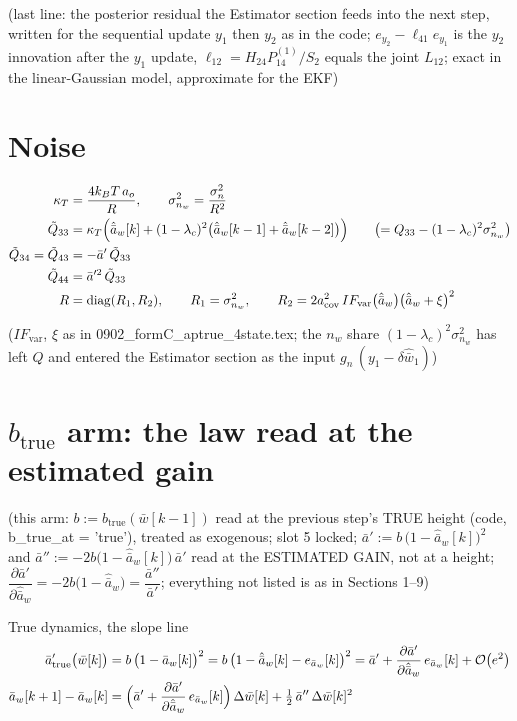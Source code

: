 \documentclass[11pt,a4paper,fontset=none]{ctexart}
\newcommand{\ba}{\bar{a}}
\newcommand{\bw}{\bar{w}}
\newcommand{\dW}{\Delta\bw}
\newcommand{\ap}{\ba'}
\newcommand{\app}{\ba''}
\begin{document}
(last line: the posterior residual the Estimator section feeds into the next step, written for the sequential update
$y_1$ then $y_2$ as in the code; $e_{y_2} - \ell_{41}e_{y_1}$ is the $y_2$ innovation after the $y_1$ update,
$\ell_{12} = H_{24}P^{(1)}_{14}/S_2$ equals the joint $L_{12}$; exact in the linear-Gaussian model, approximate for the EKF)

\section{Noise}

\begin{align*}
\kappa_T &= \frac{4k_BT\,a_o}{R}, \qquad \sigma^{2}_{n_w} = \frac{\sigma^{2}_{n}}{R^{2}} \\
\tilde{Q}_{33} &= \kappa_T\Bigl(\hat{\ba}_w[k] + (1-\lambda_c)^{2}\bigl(\hat{\ba}_w[k-1] + \hat{\ba}_w[k-2]\bigr)\Bigr)
   \qquad \bigl(= Q_{33} - (1-\lambda_c)^{2}\sigma^{2}_{n_w}\bigr) \\
\tilde{Q}_{34} = \tilde{Q}_{43} &= -\ap\,\tilde{Q}_{33} \\
\tilde{Q}_{44}   &= \ap^{2}\,\tilde{Q}_{33} \\
R        &= \mathrm{diag}(R_1, R_2), \qquad R_1 = \sigma^{2}_{n_w}, \qquad
R_2 = 2a_{\mathrm{cov}}^{2}\,IF_{\mathrm{var}}\bigl(\hat{\ba}_w\bigr)\bigl(\hat{\ba}_w + \xi\bigr)^{2}
\end{align*}

($IF_{\mathrm{var}}$, $\xi$ as in 0902\_formC\_aptrue\_4state.tex; the $n_w$ share $(1-\lambda_c)^{2}\sigma^{2}_{n_w}$ has left $Q$ and entered the Estimator section as the input $g_n\,(y_1 - \delta\hat{\bw}_1)$)

\clearpage
\section{$b_{\mathrm{true}}$ arm: the law read at the estimated gain}

(this arm: $b := b_{\mathrm{true}}(\bw[k-1])$ read at the previous step's TRUE height (code, b\_true\_at = 'true'), treated as exogenous; slot 5 locked;
$\ap := b\,\bigl(1 - \hat{\ba}_w[k]\bigr)^{2}$ and $\app := -2b\bigl(1 - \hat{\ba}_w[k]\bigr)\,\ap$ read at the ESTIMATED GAIN, not at a height;
$\dfrac{\partial\ap}{\partial\hat{\ba}_w} = -2b\bigl(1 - \hat{\ba}_w\bigr) = \dfrac{\app}{\ap}$;
everything not listed is as in Sections 1--9)

True dynamics, the slope line
\begin{align*}
\ap_{\mathrm{true}}\bigl(\bw[k]\bigr) &= b\,\bigl(1 - \ba_w[k]\bigr)^{2}
  = b\,\bigl(1 - \hat{\ba}_w[k] - e_{\ba_w}[k]\bigr)^{2}
  = \ap + \frac{\partial\ap}{\partial\hat{\ba}_w}\,e_{\ba_w}[k] + \mathcal{O}\bigl(e^{2}\bigr) \\
\ba_w[k+1] - \ba_w[k] &= \Bigl(\ap + \frac{\partial\ap}{\partial\hat{\ba}_w}\,e_{\ba_w}[k]\Bigr)\,\dW[k] + \tfrac{1}{2}\,\app\,\dW[k]^{2}
\end{align*}
\end{document}
